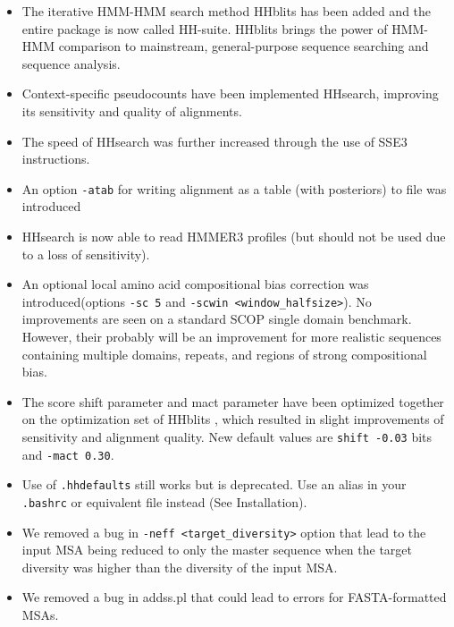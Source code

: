 \documentclass[11pt,a4paper]{article}
\begin{document}
\begin{itemize}

\item The iterative HMM-HMM search method HHblits has been added and the entire package is now called HH-suite. HHblits brings the power of HMM-HMM comparison to mainstream, general-purpose sequence searching and sequence analysis. 

\item Context-specific pseudocounts have been implemented HHsearch, improving its sensitivity and quality of alignments.

\item The speed of HHsearch was further increased through the use of SSE3 instructions.

\item An option \verb`-atab` for writing alignment as a table (with posteriors) to file was introduced

\item HHsearch is now able to read HMMER3 profiles (but should not be used due to a loss of sensitivity).

\item An optional local amino acid compositional bias correction was introduced(options \verb`-sc 5` and \verb`-scwin <window_halfsize>`). No improvements are seen on a standard SCOP single domain benchmark. However, their probably will be an improvement for more realistic sequences containing multiple domains, repeats, and regions of strong compositional bias. 

\item The score shift parameter and mact parameter have been optimized together on the optimization set of HHblits \cite{Remmert:2011}, which resulted in slight improvements of sensitivity and alignment quality. New default values are  \verb`shift -0.03` bits and \verb`-mact 0.30`. 

\item Use of \verb`.hhdefaults` still works but is deprecated. Use an alias in 
your \verb`.bashrc` or equivalent file instead (See Installation).

\item We removed a bug in \verb`-neff <target_diversity>` option that lead to the input MSA being reduced to only the master sequence when the target diversity was higher than the diversity of the input MSA.

\item We removed a bug in addss.pl that could lead to errors for FASTA-formatted MSAs.

\end{itemize}
\end{document}
